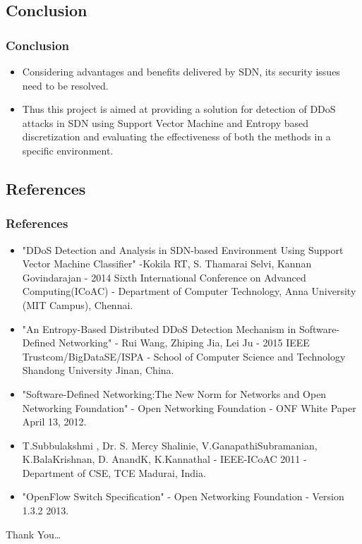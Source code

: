 \documentclass[10pt]{beamer}
\begin{document}
\begin{frame}
\section[]{Conclusion}
\frametitle{Conclusion}

\begin{itemize}
\footnotesize
\item
Considering advantages and benefits delivered by SDN, its security issues need to be resolved.
\item
Thus this project is aimed at providing a solution for detection of DDoS attacks in SDN using Support Vector Machine and Entropy based discretization and evaluating the effectiveness of both the methods in a specific environment.
\end{itemize}
\end{frame}


\begin{frame}
\section[]{References}
\frametitle{References}
\begin{itemize}
\footnotesize
\item
"DDoS Detection and Analysis in SDN-based Environment Using Support Vector Machine Classifier" -Kokila RT, S. Thamarai Selvi, Kannan Govindarajan - 2014 Sixth International Conference on Advanced Computing(ICoAC) - Department of Computer Technology, Anna University (MIT Campus), Chennai.

\item
"An Entropy-Based Distributed DDoS Detection Mechanism in Software-Defined Networking" - Rui Wang, Zhiping Jia, Lei Ju - 2015 IEEE Trustcom/BigDataSE/ISPA - School of Computer Science and Technology Shandong University Jinan, China.

\item
"Software-Defined Networking:The New Norm for Networks and 
Open Networking Foundation" - Open Networking Foundation - ONF White Paper April 13, 2012.

\item
T.Subbulakshmi , Dr. S. Mercy Shalinie, V.GanapathiSubramanian, K.BalaKrishnan, D. AnandK, K.Kannathal - IEEE-ICoAC 2011 - Department of CSE, TCE Madurai, India.

\item
"OpenFlow Switch Specification" - Open Networking Foundation - Version 1.3.2 2013.

\end{itemize}
\end{frame}

\begin{frame}{}
\Huge
Thank You\ldots
\end{frame}
\end{document}
